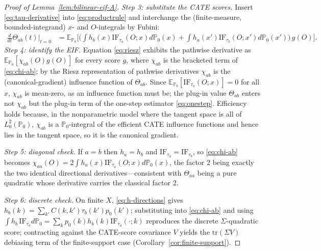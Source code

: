 \begin{proof}[Proof of Lemma~\ref{lem:bilinear-eif-A}]
\emph{Step 3: substitute the CATE scores.} Insert \eqref{eq:tau-derivative} into
\eqref{eq:productrule} and interchange the (finite-measure, bounded-integrand) $x$- and
$O$-integrals by Fubini:
\begin{align}
\frac{d}{dt}\Theta_{ab}(t)\Big|_{t=0}
 &= \mathbb{E}_{\mathbb{P}_0}\!\Big[\Big(\int h_b(x)\mathrm{IF}_{\tau_a}(O;x)d\mathbb{P}_0(x)
     + \int h_a(x')\mathrm{IF}_{\tau_b}(O;x')d\mathbb{P}_0(x')\Big)\,g(O)\Big].
\label{eq:riesz}
\end{align}
\emph{Step 4: identify the EIF.} Equation \eqref{eq:riesz} exhibits the pathwise derivative as
$\mathbb{E}_{\mathbb{P}_0}[\chi_{ab}(O)g(O)]$ for every score $g$, where $\chi_{ab}$ is the
bracketed term of \eqref{eq:chi-ab}; by the Riesz representation of pathwise derivatives
$\chi_{ab}$ is the (canonical-gradient) influence function of $\Theta_{ab}$. Since
$\mathbb{E}_{\mathbb{P}_0}[\mathrm{IF}_{\tau_a}(O;x)]=0$ for all $x$, $\chi_{ab}$ is mean-zero,
as an influence function must be; the plug-in value $\Theta_{ab}$ enters not $\chi_{ab}$ but the
plug-in term of the one-step estimator \eqref{eq:onestep}. Efficiency holds because, in the
nonparametric model where the tangent space is all of $L^2_0(\mathbb{P}_0)$, $\chi_{ab}$ is a
$\mathbb{P}_0$-integral of the efficient CATE influence functions and hence lies in the tangent
space, so it is the canonical gradient.

\emph{Step 5: diagonal check.} If $a=b$ then $h_a=h_b$ and $\mathrm{IF}_{\tau_a}=\mathrm{IF}_{\tau_b}$,
so \eqref{eq:chi-ab} becomes
$\chi_{aa}(O)=2\int h_a(x)\mathrm{IF}_{\tau_a}(O;x)d\mathbb{P}_0(x)$, the factor $2$
being exactly the two identical directional derivatives---consistent with $\Theta_{aa}$ being a
pure quadratic whose derivative carries the classical factor $2$.

\emph{Step 6: discrete check.} On finite $X$, \eqref{eq:h-directions} gives
$h_b(k)=\sum_{k'}C(k,k')\tau_b(k')p_0(k')$; substituting into \eqref{eq:chi-ab} and using
$\int h_b\,\mathrm{IF}_{\tau_a}d\mathbb{P}_0=\sum_k p_0(k)h_b(k)\mathrm{IF}_{\tau_a}(\cdot;k)$
reproduces the discrete $\Sigma$-quadratic score; contracting against the CATE-score covariance
$V$ yields the $\mathrm{tr}(\Sigma V)$ debiasing term of the finite-support case
(Corollary~\ref{cor:finite-support}).
\end{proof}

